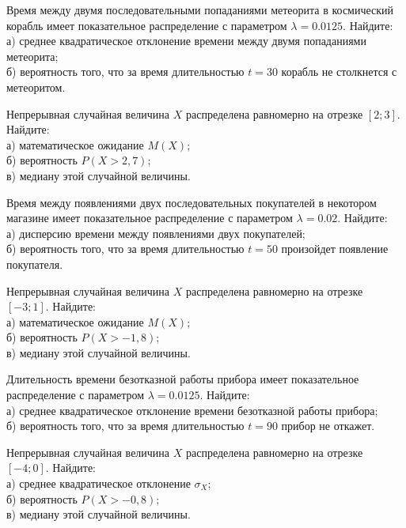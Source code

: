 \z Время между двумя последовательными попаданиями метеорита в космический корабль имеет показательное распределение с параметром $\lambda = 0.0125$. Найдите: \\ \quad а) среднее квадратическое отклонение времени между двумя попаданиями метеорита; \\ \quad б) вероятность того, что за время длительностью $t = 30$ корабль не столкнется с метеоритом.
 

\vfill

\newpage\setcounter{zad}{0}

\z Непрерывная случайная величина $X$ распределена равномерно на отрезке $[2; 3]$. Найдите: \\ \quad а) математическое ожидание $M(X)$; \\ \quad б) вероятность $P(X>2{,}7)$; \\ \quad в) медиану этой случайной величины.


\vfill

\z Время между появлениями двух последовательных покупателей в некотором магазине имеет показательное распределение с параметром $\lambda = 0.02$. Найдите: \\ \quad а) дисперсию времени между появлениями двух покупателей; \\ \quad б) вероятность того, что за время длительностью $t = 50$  произойдет появление покупателя.
 

\vfill

\newpage\setcounter{zad}{0}

\z Непрерывная случайная величина $X$ распределена равномерно на отрезке $[-3; 1]$. Найдите: \\ \quad а) математическое ожидание $M(X)$; \\ \quad б) вероятность $P(X>-1{,}8)$; \\ \quad в) медиану этой случайной величины.


\vfill

\z Длительность времени безотказной работы прибора имеет показательное распределение с параметром $\lambda = 0.0125$. Найдите: \\ \quad а) среднее квадратическое отклонение времени безотказной работы прибора; \\ \quad б) вероятность того, что за время длительностью $t = 90$ прибор не откажет.
 

\vfill

\newpage\setcounter{zad}{0}

\z Непрерывная случайная величина $X$ распределена равномерно на отрезке $[-4; 0]$. Найдите: \\ \quad а) среднее квадратическое отклонение $\sigma_X$; \\ \quad б) вероятность $P(X>-0{,}8)$; \\ \quad в) медиану этой случайной величины.


